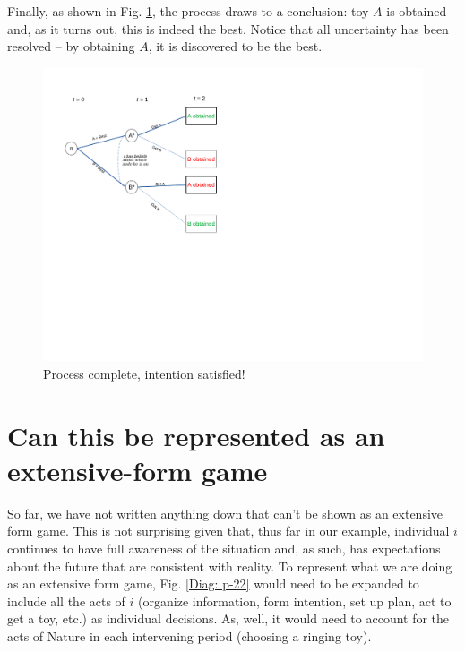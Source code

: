 \documentclass[
11pt,
titlepage,
reqno,
]{article}%
\theoremstyle{definition}
\begin{document}
Finally, as shown in Fig. \ref{Diag: p-21}, the process draws to a conclusion: toy $A$ is obtained and, as it turns out, this is indeed the best. Notice that all uncertainty has been resolved -- by obtaining $A$, it is discovered to be the best.

\begin{figure}[h!]
	\centering
	\includegraphics*[page=21,trim = 0in 5in 0in 0in,scale=.6]{Awareness_Diagrams_All}
	\caption{Process complete, intention satisfied!\label{Diag: p-21}}%
\end{figure}


\section*{Can this be represented as an extensive-form game}

So far, we have not written anything down that can't be shown as an extensive form game. This is not surprising given that, thus far in our example, individual $i$ continues to have full awareness of the situation and, as such, has expectations about the future that are consistent with reality. To represent what we are doing as an extensive form game, Fig. \ref{Diag: p-22} would need to be expanded to include all the acts of $i$ (organize information, form intention, set up plan,  act to get a toy, etc.) as individual decisions. As, well, it would need to account for the acts of Nature in each intervening period (choosing a ringing toy). 
\end{document}
